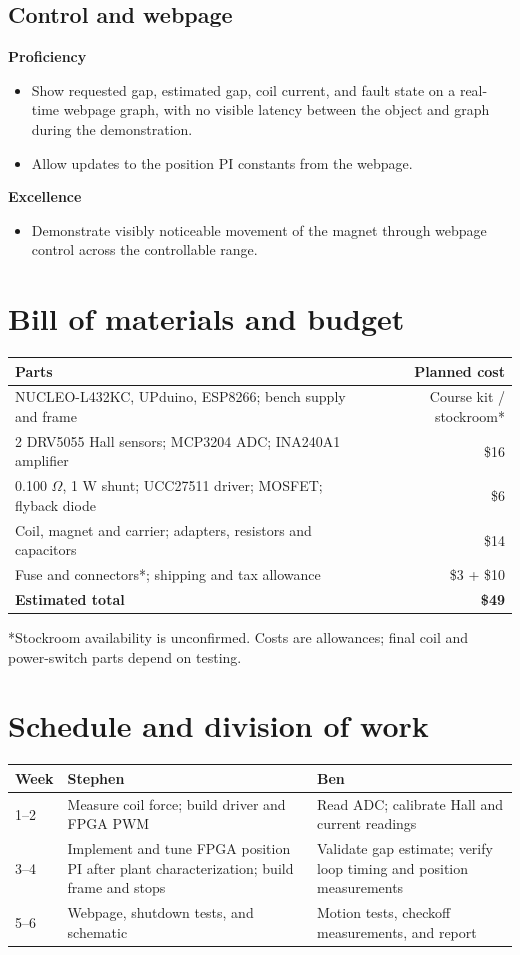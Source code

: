 \documentclass[11pt,letterpaper]{article}
\newcommand{\checkitem}{\item[$\square$]}
\begin{document}
\subsection{Control and webpage}
\textbf{Proficiency}
\begin{itemize}
 \checkitem Show requested gap, estimated gap, coil current, and fault state
 on a real-time webpage graph, with no visible latency between the object
 and graph during the demonstration.
 \checkitem Allow updates to the position PI constants from the webpage.
\end{itemize}
\textbf{Excellence}
\begin{itemize}
 \checkitem Demonstrate visibly noticeable movement of the magnet through
 webpage control across the controllable range.
\end{itemize}

\section{Bill of materials and budget}
\begin{tabularx}{\linewidth}{@{}X r@{}}
\toprule
Parts & Planned cost\\
\midrule
NUCLEO-L432KC, UPduino, ESP8266; bench supply and frame & Course kit / stockroom*\\
2 DRV5055 Hall sensors; MCP3204 ADC; INA240A1 amplifier & \$16\\
0.100 \(\Omega\), 1 W shunt; UCC27511 driver; MOSFET; flyback diode & \$6\\
Coil, magnet and carrier; adapters, resistors and capacitors & \$14\\
Fuse and connectors*; shipping and tax allowance & \$3 + \$10\\
\midrule
\textbf{Estimated total} & \textbf{\$49}\\
\bottomrule
\end{tabularx}

*Stockroom availability is unconfirmed. Costs are allowances; final coil
and power-switch parts depend on testing.

\section{Schedule and division of work}
\begin{tabularx}{\linewidth}{@{}l X X@{}}
\toprule
Week & Stephen & Ben\\
\midrule
1--2 & Measure coil force; build driver and FPGA PWM &
Read ADC; calibrate Hall and current readings\\
3--4 & Implement and tune FPGA position PI after plant characterization;
build frame and stops & Validate gap estimate; verify loop timing and
position measurements\\
5--6 & Webpage, shutdown tests, and schematic &
Motion tests, checkoff measurements, and report\\
\bottomrule
\end{tabularx}
\end{document}
